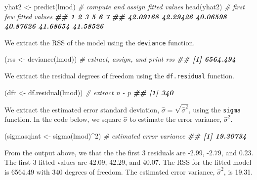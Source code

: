 \documentclass[
]{book}
\newenvironment{Shaded}{\begin{snugshade}}{\end{snugshade}}
\newcommand{\CommentTok}[1]{\textcolor[rgb]{0.56,0.35,0.01}{\textit{#1}}}
\newcommand{\DecValTok}[1]{\textcolor[rgb]{0.00,0.00,0.81}{#1}}
\newcommand{\DocumentationTok}[1]{\textcolor[rgb]{0.56,0.35,0.01}{\textbf{\textit{#1}}}}
\newcommand{\FunctionTok}[1]{\textcolor[rgb]{0.00,0.00,0.00}{#1}}
\newcommand{\NormalTok}[1]{#1}
\newcommand{\OtherTok}[1]{\textcolor[rgb]{0.56,0.35,0.01}{#1}}
\newcommand{\SpecialCharTok}[1]{\textcolor[rgb]{0.00,0.00,0.00}{#1}}
\theoremstyle{definition}
\theoremstyle{definition}
\theoremstyle{definition}
\theoremstyle{definition}
\theoremstyle{remark}
\begin{document}
\begin{Shaded}
\begin{Highlighting}[]
\NormalTok{yhat2 }\OtherTok{\textless{}{-}} \FunctionTok{predict}\NormalTok{(lmod) }\CommentTok{\# compute and assign fitted values}
\FunctionTok{head}\NormalTok{(yhat2) }\CommentTok{\# first few fitted values}
\DocumentationTok{\#\#        1        2        3        5        6        7 }
\DocumentationTok{\#\# 42.09168 42.29426 40.06598 40.87626 41.68654 41.58526}
\end{Highlighting}
\end{Shaded}

We extract the RSS of the model using the \texttt{deviance} function.

\begin{Shaded}
\begin{Highlighting}[]
\NormalTok{(rss }\OtherTok{\textless{}{-}} \FunctionTok{deviance}\NormalTok{(lmod)) }\CommentTok{\# extract, assign, and print rss}
\DocumentationTok{\#\# [1] 6564.494}
\end{Highlighting}
\end{Shaded}

We extract the residual degrees of freedom using the \texttt{df.residual} function.

\begin{Shaded}
\begin{Highlighting}[]
\NormalTok{(dfr }\OtherTok{\textless{}{-}} \FunctionTok{df.residual}\NormalTok{(lmod)) }\CommentTok{\# extract n {-} p}
\DocumentationTok{\#\# [1] 340}
\end{Highlighting}
\end{Shaded}

We extract the estimated error standard deviation, \(\hat{\sigma}=\sqrt{\hat{\sigma}^2}\), using the \texttt{sigma} function. In the code below, we square \(\hat{\sigma}\) to estimate the error variance, \(\hat{\sigma}^2\).

\begin{Shaded}
\begin{Highlighting}[]
\NormalTok{(sigmasqhat }\OtherTok{\textless{}{-}} \FunctionTok{sigma}\NormalTok{(lmod)}\SpecialCharTok{\^{}}\DecValTok{2}\NormalTok{) }\CommentTok{\# estimated error variance}
\DocumentationTok{\#\# [1] 19.30734}
\end{Highlighting}
\end{Shaded}

From the output above, we that the the first 3 residuals are -2.99, -2.79, and 0.23. The first 3 fitted values are 42.09, 42.29, and 40.07. The RSS for the fitted model is 6564.49 with 340 degrees of freedom. The estimated error variance, \(\hat{\sigma}^2\), is 19.31.
\end{document}
